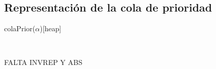 \subsection{Representación de la cola de prioridad}
\begin{Representacion}
  
  \begin{Estructura}{colaPrior($\alpha$)}[heap]

  \begin{Tupla}[heap]
  \end{Tupla}

  ~

  \begin{Tupla}[nodo]
  \end{Tupla}

  \end{Estructura}


  
FALTA INVREP Y ABS



\end{Representacion}






